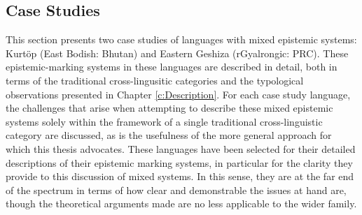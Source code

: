 \subsection{Case Studies}\label{ss:Discussion:MixedCases}
This section presents two case studies of languages with mixed epistemic systems: Kurtöp (East Bodish: Bhutan) and Eastern Geshiza (rGyalrongic: PRC). These epistemic-marking systems in these languages are described in detail, both in terms of the traditional cross-lingusitic categories and the typological observations presented in Chapter \ref{c:Description}. For each case study language, the challenges that arise when attempting to describe these mixed epistemic systems solely within the framework of a single traditional cross-linguistic category are discussed, as is the usefulness of the more general approach for which this thesis advocates. These languages have been selected for their detailed descriptions of their epistemic marking systems, in particular for the clarity they provide to this discussion of mixed systems. In this sense, they are at the far end of the spectrum in terms of how clear and demonstrable the issues at hand are, though the theoretical arguments made are no less applicable to the wider family.
